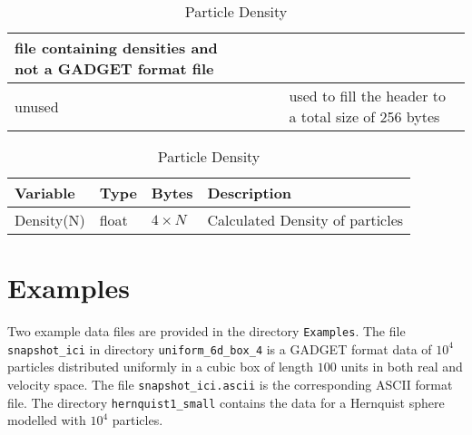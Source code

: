 \documentclass{article}
\begin{document}
\begin{table}[here]
\begin{tabular}{|p{1.5cm}|p{1.5cm}|p{1.5cm}|p{6cm}|}
file containing densities and not a GADGET format file\\
\hline
unused &  &  & used to fill the header to a total size of 256 bytes \\
\hline
\end{tabular}
  \caption{Particle Density}
  \begin{tabular}{|p{1.5cm}|p{1.5cm}|p{1.5cm}|p{6cm}|}
\hline
\hline
  Variable     &  Type   &   Bytes & Description\\
\hline
Density(N) & float & $4 \times N$ & Calculated Density of particles \\
\hline
\end{tabular}
\end{table}


\section{Examples}
Two example data files are provided in the 
directory \verb$Examples$. The file \newline 
\verb$snapshot_ici$ in 
directory \verb$uniform_6d_box_4$ is a GADGET format data
of $10^4$ particles distributed uniformly in a cubic box of 
length $100$ units in both real and velocity space. 
The file \verb$snapshot_ici.ascii$ is the corresponding ASCII
format file. The directory \verb$hernquist1_small$ contains 
the data for a Hernquist sphere modelled with $10^4$ particles.
\end{document}
